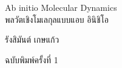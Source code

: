

{
\thispagestyle{empty}

\begin{center}
    \vspace*{2.0in}
    
    \begin{spacing}{3}
    {\Huge Ab initio Molecular Dynamics}\\
    {\LARGE พลวัตเชิงโมเลกุลแบบแอบ อินิชิโอ}
    \end{spacing}
    
    \vspace{1.0in}
    
    {\LARGE  รังสิมันต์ เกษแก้ว}
    
    \vspace{1.5in}
    
    {\LARGE ฉบับพิมพ์ครั้งที่ 1}
    \vspace{0.5in}
    
    \vfill
\end{center}
}
